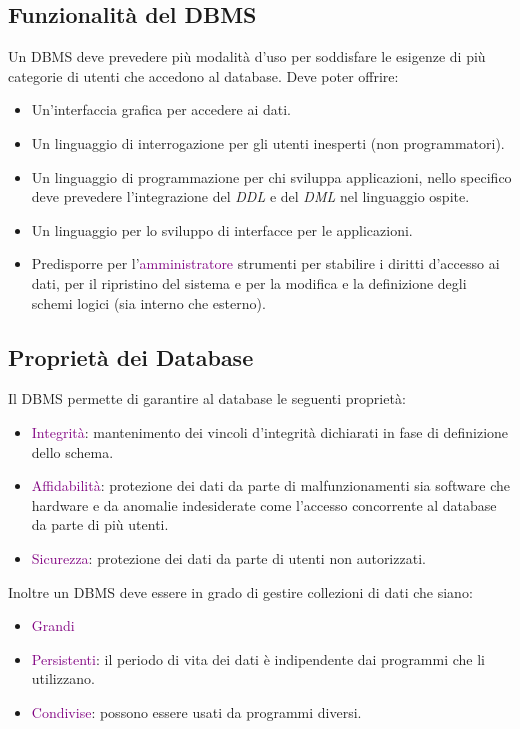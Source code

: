 \subsection{Funzionalità del DBMS}
Un DBMS deve prevedere più modalità d'uso per soddisfare le esigenze di più categorie di utenti
che accedono al database. Deve poter offrire:

\begin{itemize}
    \item Un'interfaccia grafica per accedere ai dati.
    \item Un linguaggio di interrogazione per gli utenti inesperti (non programmatori).
    \item Un linguaggio di programmazione per chi sviluppa applicazioni, nello specifico deve prevedere
        l'integrazione del \emph{DDL} e del \emph{DML} nel linguaggio ospite.
    \item Un linguaggio per lo sviluppo di interfacce per le applicazioni.
    \item Predisporre per l'\textcolor{purple}{amministratore} strumenti per stabilire i diritti d'accesso ai dati,
        per il ripristino del sistema e per la modifica e la definizione degli schemi logici (sia interno che esterno).
    
\end{itemize}

\subsection{Proprietà dei Database}
Il DBMS permette di garantire al database le seguenti proprietà:
\begin{itemize}
    \item \textcolor{purple}{Integrità}: mantenimento dei vincoli d'integrità dichiarati in fase di definizione dello schema.
    \item \textcolor{purple}{Affidabilità}: protezione dei dati da parte di malfunzionamenti sia software che hardware e da anomalie indesiderate
        come l'accesso concorrente al database da parte di più utenti.
    \item \textcolor{purple}{Sicurezza}: protezione dei dati da parte di utenti non autorizzati.
\end{itemize}

Inoltre un DBMS deve essere in grado di gestire collezioni di dati che siano:
\begin{itemize}
    \item \textcolor{purple}{Grandi}
    \item \textcolor{purple}{Persistenti}: il periodo di vita dei dati è indipendente dai programmi che li utilizzano.
    \item \textcolor{purple}{Condivise}: possono essere usati da programmi diversi.
\end{itemize}

